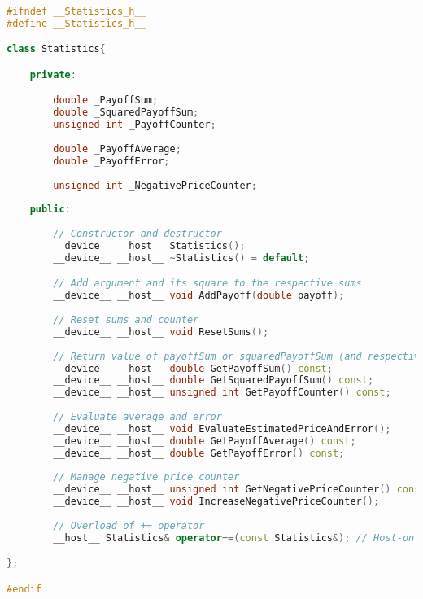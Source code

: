 \begin{lstlisting}[language=C++, caption={\texttt{libraries/CoreLibraries/Statistics/Statistics.cuh}}]
#ifndef __Statistics_h__
#define __Statistics_h__

class Statistics{

	private:

		double _PayoffSum;
		double _SquaredPayoffSum;
		unsigned int _PayoffCounter;
		
		double _PayoffAverage;
		double _PayoffError;
		
		unsigned int _NegativePriceCounter;
		
	public:
	
		// Constructor and destructor
		__device__ __host__ Statistics();
		__device__ __host__ ~Statistics() = default;

		// Add argument and its square to the respective sums
		__device__ __host__ void AddPayoff(double payoff);
		
		// Reset sums and counter
		__device__ __host__ void ResetSums();
				
		// Return value of payoffSum or squaredPayoffSum (and respective counters)
		__device__ __host__ double GetPayoffSum() const;
		__device__ __host__ double GetSquaredPayoffSum() const;
		__device__ __host__ unsigned int GetPayoffCounter() const;
		
		// Evaluate average and error
		__device__ __host__ void EvaluateEstimatedPriceAndError();
		__device__ __host__ double GetPayoffAverage() const;
		__device__ __host__ double GetPayoffError() const;
		
		// Manage negative price counter
		__device__ __host__ unsigned int GetNegativePriceCounter() const;
		__device__ __host__ void IncreaseNegativePriceCounter();
		
		// Overload of += operator
		__host__ Statistics& operator+=(const Statistics&);	// Host-only because of isinf, at least for now

};

#endif
\end{lstlisting}

